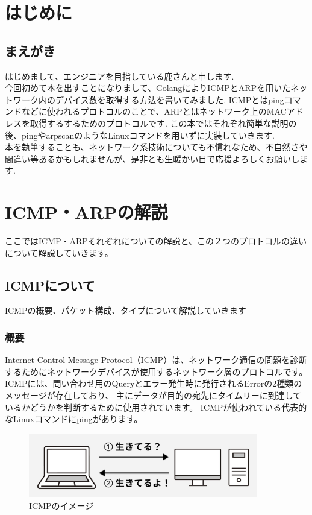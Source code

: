 \chapter{はじめに}
\section{まえがき}
はじめまして、エンジニアを目指している鹿さんと申します.\\
今回初めて本を出すことになりまして、GolangによりICMPとARPを用いたネットワーク内のデバイス数を取得する方法を書いてみました.
ICMPとはpingコマンドなどに使われるプロトコルのことで、ARPとはネットワーク上のMACアドレスを取得するするためのプロトコルです.
この本ではそれぞれ簡単な説明の後、pingやarpscanのようなLinuxコマンドを用いずに実装していきます.\\
本を執筆することも、ネットワーク系技術についても不慣れなため、不自然さや間違い等あるかもしれませんが、是非とも生暖かい目で応援よろしくお願いします.

\chapter{ICMP・ARPの解説}
ここではICMP・ARPそれぞれについての解説と、この２つのプロトコルの違いについて解説していきます。
\section{ICMPについて}
ICMPの概要、パケット構成、タイプについて解説していきます
\subsection{概要}
Internet Control Message Protocol（ICMP）は、ネットワーク通信の問題を診断するためにネットワークデバイスが使用するネットワーク層のプロトコルです\cite{icmp}。 \\
ICMPには、問い合わせ用のQueryとエラー発生時に発行されるErrorの2種類のメッセージが存在しており、
主にデータが目的の宛先にタイムリーに到達しているかどうかを判断するために使用されています。
ICMPが使われている代表的なLinuxコマンドにpingがあります。
\begin{figure}[H]
    \centering
    \includegraphics[width=10cm]{image/02-Body/icmp_image.jpeg}
    \caption{ICMPのイメージ}
    \label{icmp_image}
\end{figure}
